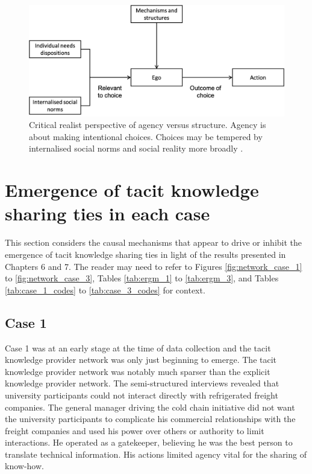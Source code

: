 \begin{figure}[hbt!]
    \centering
    \includegraphics[width = \textwidth]{Images/agency_structure_loyal.png}
    \caption[]{Critical realist perspective of agency versus structure. Agency is about making intentional choices. Choices may be tempered by internalised social norms and social reality more broadly \citep{loyal2001agency}.}
    \label{fig:agency_structure4}
\end{figure}

\section{Emergence of tacit knowledge sharing ties in each case}

This section considers the causal mechanisms that appear to drive or inhibit the emergence of tacit knowledge sharing ties in light of the results presented in Chapters 6 and 7. The reader may need to refer to Figures \ref{fig:network_case_1} to \ref{fig:network_case_3}, Tables \ref{tab:ergm_1} to \ref{tab:ergm_3}, and Tables \ref{tab:case_1_codes} to \ref{tab:case_3_codes} for context.

\subsection{Case 1}

Case 1 was at an early stage at the time of data collection and the tacit knowledge provider network was only just beginning to emerge. The tacit knowledge provider network was notably much sparser than the explicit knowledge provider network. The semi-structured interviews revealed that university participants could not interact directly with refrigerated freight companies. The general manager driving the cold chain initiative did not want the university participants to complicate his commercial relationships with the freight companies and used his power over others or authority to limit interactions. He operated as a gatekeeper, believing he was the best person to translate technical information. His actions limited agency vital for the sharing of know-how. \medskip

